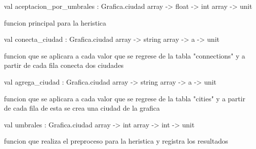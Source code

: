 \documentclass[11pt]{article}
\begin{document}
\label{val:Umbrales.aceptacion-underscorepor-underscoreumbrales}\begin{ocamldoccode}
val aceptacion_por_umbrales :
  Grafica.ciudad array -> float -> int array -> unit
\end{ocamldoccode}
\begin{ocamldocdescription}
funcion principal para la heristica


\end{ocamldocdescription}




\label{val:Umbrales.conecta-underscoreciudad}\begin{ocamldoccode}
val conecta_ciudad : Grafica.ciudad array -> string array -> {\textquotesingle}a -> unit
\end{ocamldoccode}
\begin{ocamldocdescription}
funcion que se aplicara a cada valor que se regrese de la tabla "connections" y a partir de cada fila conecta dos ciudades


\end{ocamldocdescription}




\label{val:Umbrales.agrega-underscoreciudad}\begin{ocamldoccode}
val agrega_ciudad : Grafica.ciudad array -> string array -> {\textquotesingle}a -> unit
\end{ocamldoccode}
\begin{ocamldocdescription}
funcion que se aplicara a cada valor que se regrese de la tabla "cities" y a partir de cada fila de esta se crea una ciudad de la grafica


\end{ocamldocdescription}




\label{val:Umbrales.umbrales}\begin{ocamldoccode}
val umbrales : Grafica.ciudad array -> int array -> int -> unit
\end{ocamldoccode}
\begin{ocamldocdescription}
funcion que realiza el preproceso para la heristica y registra los resultados


\end{ocamldocdescription}
\end{document}
